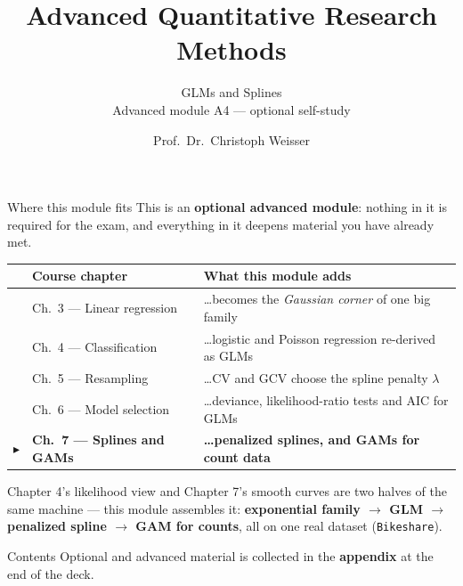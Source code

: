 \documentclass[aspectratio=169,11pt]{beamer}
\title{Advanced Quantitative Research Methods}
\subtitle{GLMs and Splines\\[2pt]{\small Advanced module A4 --- optional self-study}}
\author{Prof.\ Dr.\ Christoph Weisser}
\date{}\graphicspath{{images/}}
\begin{document}
\begin{frame}[plain]\titlepage\end{frame}

\begin{frame}{Where this module fits}
  \footnotesize
  This is an \textbf{optional advanced module}: nothing in it is required for the exam,
  and everything in it deepens material you have already met.
  \begin{center}
  \begin{tabular}{@{}c l l@{}}
    & \textbf{Course chapter} & \textbf{What this module adds} \\
    \midrule
    & Ch.\ 3 --- Linear regression & \ldots{}becomes the \emph{Gaussian corner} of one big family \\
    & Ch.\ 4 --- Classification & \ldots{}logistic and Poisson regression re-derived as GLMs \\
    & Ch.\ 5 --- Resampling & \ldots{}CV and GCV choose the spline penalty $\lambda$ \\
    & Ch.\ 6 --- Model selection & \ldots{}deviance, likelihood-ratio tests and AIC for GLMs \\
    $\blacktriangleright$ & \textbf{Ch.\ 7 --- Splines and GAMs} & \textbf{\ldots{}penalized splines, and GAMs for count data} \\
  \end{tabular}
  \end{center}
  \vspace{2pt}
  \begin{takeaway}
    Chapter 4's likelihood view and Chapter 7's smooth curves are two halves of the same
    machine --- this module assembles it: \textbf{exponential family $\to$ GLM $\to$
    penalized spline $\to$ GAM for counts}, all on one real dataset (\texttt{Bikeshare}).
  \end{takeaway}
\end{frame}

\begin{frame}{Contents}\small\tableofcontents[hideallsubsections]
  \vfill
  {\tiny Optional and advanced material is collected in the \textbf{appendix} at the end of the deck.}
\end{frame}
\end{document}
